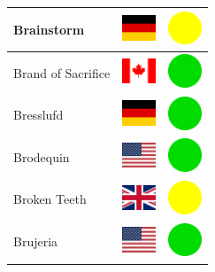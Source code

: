 \documentclass[12pt, a4paper, twoside]{report}
\begin{document}
\begin{center}
\begin{longtable}{|p{5cm}|p{2cm}|p{2cm}|}
 Brainstorm                                                 & \includegraphics[width=1cm]{../img/flags/de} &   \includegraphics[width=1cm]{../likes/m} \\ \hline
 Brand of Sacrifice                                         & \includegraphics[width=1cm]{../img/flags/ca} &   \includegraphics[width=1cm]{../likes/y} \\ \hline
 Bresslufd                                                  & \includegraphics[width=1cm]{../img/flags/de} &   \includegraphics[width=1cm]{../likes/y} \\ \hline
 Brodequin                                                  & \includegraphics[width=1cm]{../img/flags/us} &   \includegraphics[width=1cm]{../likes/y} \\ \hline
 Broken Teeth                                               & \includegraphics[width=1cm]{../img/flags/gb} &   \includegraphics[width=1cm]{../likes/m} \\ \hline
 Brujeria                                                   & \includegraphics[width=1cm]{../img/flags/us} &   \includegraphics[width=1cm]{../likes/y} \\ \hline

\end{longtable}
\end{center}
\end{document}
